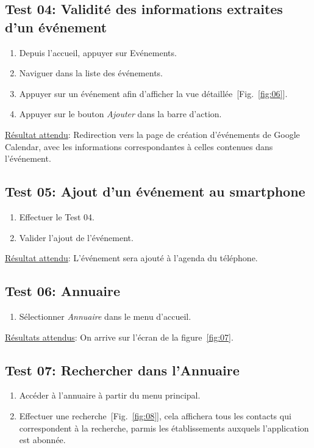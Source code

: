   \subsection*{Test 04: Validité des informations extraites d'un événement}
    \begin{enumerate}
    \item Depuis l'accueil, appuyer sur Evénements.
    \item Naviguer dans la liste des événements.
    \item Appuyer sur un événement afin d'afficher la vue détaillée~[Fig.~\ref{fig:06}].
    \item Appuyer sur le bouton \emph{Ajouter} dans la barre d'action.
    \end{enumerate}

    \underline{Résultat attendu}: Redirection vers la page de création d'événements de Google Calendar, avec les informations correspondantes à celles contenues dans l'événement.

  \subsection*{Test 05: Ajout d'un événement au smartphone}
    \begin{enumerate}
    \item Effectuer le Test 04.
    \item Valider l'ajout de l'événement.
    \end{enumerate}

    \underline{Résultat attendu}: L'événement sera ajouté à l'agenda du téléphone.


  \subsection*{Test 06: Annuaire}
    \begin{enumerate}
    \item Sélectionner \emph{Annuaire} dans le menu d'accueil.
    \end{enumerate}

    \underline{Résultats attendus}: On arrive sur l'écran de la figure~\ref{fig:07}.

  \subsection*{Test 07: Rechercher dans l'Annuaire}
    \begin{enumerate}
    \item Accéder à l'annuaire à partir du menu principal.
    \item Effectuer une recherche~[Fig.~\ref{fig:08}], cela affichera tous les contacts qui correspondent à la recherche, parmis les établissements auxquels l'application est abonnée.
    \end{enumerate}

